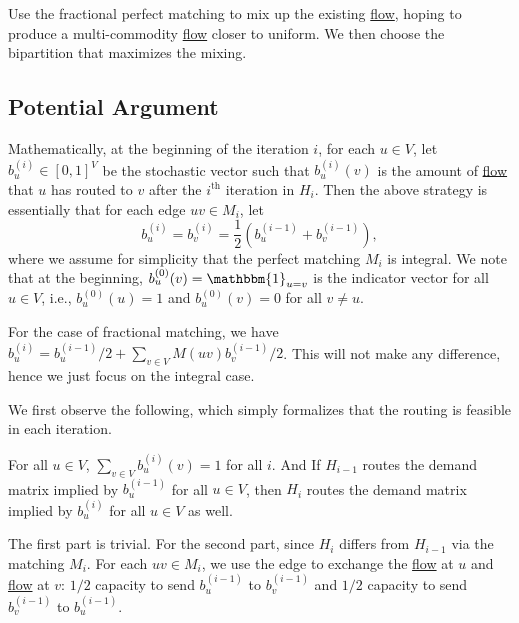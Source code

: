 \begin{intuition}
	Use the fractional perfect matching to mix up the existing \hyperref[def:flow]{flow}, hoping to produce a multi-commodity \hyperref[def:flow]{flow} closer to uniform. We then choose the bipartition that maximizes the mixing.
\end{intuition}

\subsection{Potential Argument}
Mathematically, at the beginning of the iteration \(i\), for each \(u \in V\), let \(b_u^{(i)} \in [0, 1]^V\) be the stochastic vector such that \(b_u^{(i)}(v)\) is the amount of \hyperref[def:flow]{flow} that \(u\) has routed to \(v\) after the \(i^{\text{th} }\) iteration in \(H_i\). Then the above strategy is essentially that for each edge \(uv \in M_i\), let
\[
	b_u^{(i)}
	= b_v^{(i)}
	= \frac{1}{2} (b_u^{(i-1)} + b_v^{(i-1)}),
\]
where we assume for simplicity that the perfect matching \(M_i\) is integral. We note that at the beginning, \(b_u^{(0)}(v) = \mathbbm{1}_{u = v} \) is the indicator vector for all \(u \in V\), i.e., \(b_u^{(0)}(u) = 1\) and \(b_u^{(0)}(v) = 0\) for all \(v \neq u\).

\begin{note}
	For the case of fractional matching, we have \(b_u^{(i)} = b_u^{(i-1)} / 2 + \sum_{v \in V} M(uv) b_v^{(i-1)} / 2\). This will not make any difference, hence we just focus on the integral case.
\end{note}

We first observe the following, which simply formalizes that the routing is feasible in each iteration.

\begin{claim}
	For all \(u \in V\), \(\sum_{v \in V} b_u^{(i)}(v) = 1\) for all \(i\). And If \(H_{i-1}\) routes the demand matrix implied by \(b_u^{(i-1)}\) for all \(u \in V\), then \(H_i\) routes the demand matrix implied by \(b_u^{(i)}\) for all \(u \in V\) as well.
\end{claim}
\begin{explanation}
	The first part is trivial. For the second part, since \(H_i\) differs from \(H_{i-1}\) via the matching \(M_i\). For each \(uv \in M_i\), we use the edge to exchange the \hyperref[def:flow]{flow} at \(u\) and \hyperref[def:flow]{flow} at \(v\): \(1 / 2\) capacity to send \(b_u^{(i-1)}\) to \(b_v^{(i-1)}\) and \(1 / 2\) capacity to send \(b_v^{(i-1)}\) to \(b_u^{(i-1)}\).
\end{explanation}

